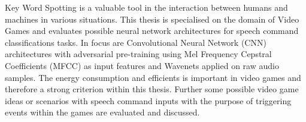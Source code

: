 
Key Word Spotting is a valuable tool in the interaction between humans and machines in various situations.
This thesis is specialised on the domain of Video Games and evaluates possible neural network architectures for speech command classifications tasks.
In focus are Convolutional Neural Network (CNN) architectures with adversarial pre-training using Mel Frequency Cepstral Coefficients (MFCC) as input features and Wavenets applied on raw audio samples.
The energy consumption and efficients is important in video games and therefore a strong criterion within this thesis.
Further some possible video game ideas or scenarios with speech command inputs with the purpose of triggering events within the games are evaluated and discussed.